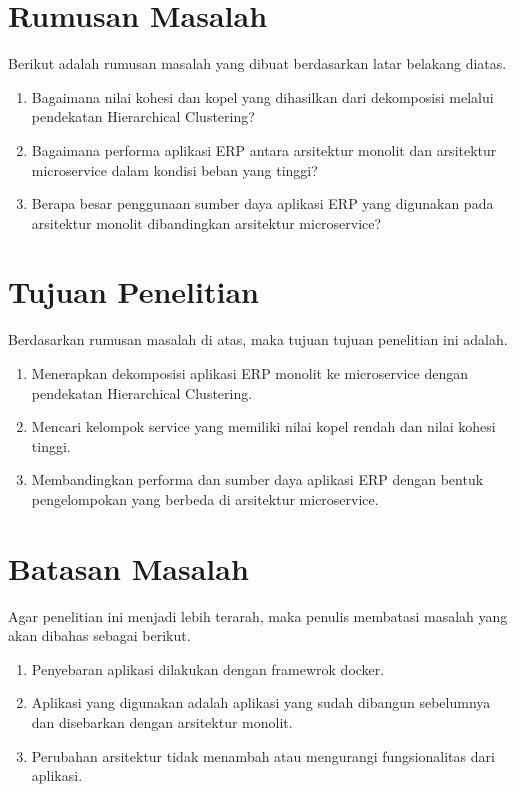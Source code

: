 \section{Rumusan Masalah}
Berikut adalah rumusan masalah yang dibuat berdasarkan latar belakang diatas.
\begin{enumerate}[nolistsep,leftmargin=0.5cm]
  \item Bagaimana nilai kohesi dan kopel yang dihasilkan dari dekomposisi melalui pendekatan Hierarchical Clustering?
  \item Bagaimana performa aplikasi ERP antara arsitektur monolit dan arsitektur microservice dalam kondisi beban yang tinggi?
  \item Berapa besar penggunaan sumber daya aplikasi ERP yang digunakan pada arsitektur monolit dibandingkan arsitektur microservice?\\
\end{enumerate}

\section{Tujuan Penelitian}
Berdasarkan rumusan masalah di atas, maka tujuan tujuan penelitian ini adalah.
\begin{enumerate}[nolistsep,leftmargin=0.5cm]
  \item Menerapkan dekomposisi aplikasi ERP monolit ke microservice dengan pendekatan Hierarchical Clustering.
  \item Mencari kelompok service yang memiliki nilai kopel rendah dan nilai kohesi tinggi.
  \item Membandingkan performa dan sumber daya aplikasi ERP dengan bentuk pengelompokan yang berbeda di arsitektur microservice. \\
\end{enumerate}

\section{Batasan Masalah}
Agar penelitian ini menjadi lebih terarah, maka penulis membatasi masalah yang akan dibahas sebagai berikut.
\begin{enumerate}[nolistsep,leftmargin=0.5cm]
  \item Penyebaran aplikasi dilakukan dengan framewrok docker.
  \item Aplikasi yang digunakan adalah aplikasi yang sudah dibangun sebelumnya dan disebarkan dengan arsitektur monolit.
  \item Perubahan arsitektur tidak menambah atau mengurangi fungsionalitas dari aplikasi.\\
\end{enumerate}

